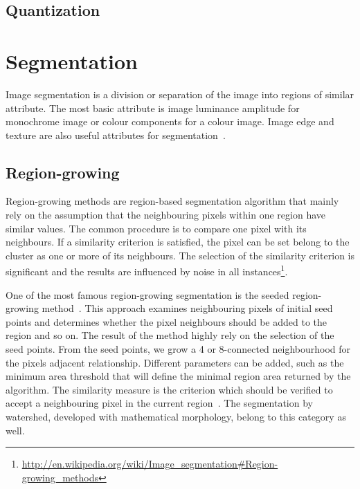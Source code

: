 \subsection*{Quantization} %
\label{sub:quantization}




\section*{Segmentation} %
\label{sub:ap:segmentation}
Image segmentation is a division or separation of the image into regions of similar attribute.
The most basic attribute is image luminance amplitude for monochrome image or colour components for a colour image.
Image edge and texture are also useful attributes for segmentation~\cite{Pratt2007Digital}.

\subsection*{Region-growing} %
\label{sub:ap:region_growing}
Region-growing methods are region-based segmentation algorithm that mainly rely on the assumption that the neighbouring pixels within one region have similar values.
The common procedure is to compare one pixel with its neighbours.
If a similarity criterion is satisfied, the pixel can be set belong to the cluster as one or more of its neighbours.
The selection of the similarity criterion is significant and the results are influenced by noise in all instances\footnote{\url{http://en.wikipedia.org/wiki/Image_segmentation\#Region-growing_methods}}.

One of the most famous region-growing segmentation is the seeded region-growing method~\cite{adams1994seeded,mehnert1997improved}.
This approach examines neighbouring pixels of initial seed points and determines whether the pixel neighbours should be added to the region and so on.
The result of the method highly rely on the selection of the seed points.
From the seed points, we grow a 4 or 8-connected neighbourhood for the pixels adjacent relationship.
Different parameters can be added, such as the minimum area threshold that will define the minimal region area returned by the algorithm.
The similarity measure is the criterion which should be verified to accept a neighbouring pixel in the current region~\cite{Gonzalez1992Digital}.
The segmentation by watershed, developed with mathematical morphology, belong to this category as well.

